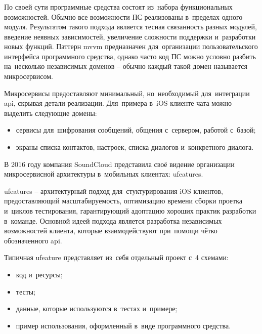 \subsubsection{}
\label{sec:analysis:research:mobArch:ufeature}

По своей сути программные средства состоят из~набора функциональных возможностей. Обычно все возможности ПС реализованы в~пределах одного модуля. Результатом такого подхода является тесная связанность разных модулей, введение неявных зависимостей, увеличение сложности поддержки и~разработки новых функций. Паттерн \gls{mvvm} предназначен для~организации пользовательского интерфейса программного средства, однако часто код ПС можно условно разбить на~несколько независимых доменов -- обычно каждый такой домен называется микросервисом.

Микросервисы предоставляют минимальный, но~необходимый для~интеграции \gls{api}, скрывая детали реализации. Для~примера в~iOS клиенте чата можно выделить следующие домены:

\begin{itemize}
	\item сервисы для~шифрования сообщений, общения с~сервером, работой с~базой;
	\item экраны списка контактов, настроек, списка диалогов и~конкретного диалога.
\end{itemize}

В 2016 году компания SoundCloud представила своё видение организации микросервисной архитектуры в~мобильных клиентах: \glspl{ufeature}.

\glspl{ufeature} -- архитектурный подход для~стуктурирования iOS клиентов, предоставляющий масштабируемость, оптимизацию времени сборки проетка и~циклов тестирования, гарантирующий адоптацию хороших практик разработки в~команде. Основной идеей подхода является разработка независимых возможностей клиента, которые взаимодействуют при~помощи чётко обозначенного \gls{api}\cite{soundcloud:ufeature}.

Типичная \gls{ufeature} представляет из~себя отдельный проект с~4 схемами:

\begin{itemize}
	\item код и~ресурсы;
	\item тесты;
	\item данные, которые используются в~тестах и~примере;
	\item пример использования, оформленный в~виде программного средства.
\end{itemize}

